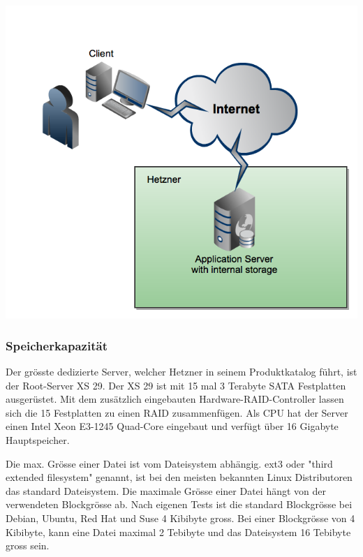\begin{center}
\includegraphics[width=\linewidth, keepaspectratio = true]{media/Hetzner.png}
\end{center}



\subsubsection*{Speicherkapazität}
Der grösste dedizierte Server, welcher Hetzner in seinem Produktkatalog führt, ist der Root-Server XS 29. Der XS 29 ist mit 15 mal 3 Terabyte SATA Festplatten ausgerüstet. Mit dem zusätzlich eingebauten Hardware-RAID-Controller lassen sich die 15 Festplatten zu einen RAID zusammenfügen.
Als CPU hat der Server einen Intel Xeon E3-1245 Quad-Core eingebaut und verfügt über 16 Gigabyte Hauptspeicher. 

Die max. Grösse einer Datei ist vom Dateisystem abhängig. ext3 oder "third extended filesystem" genannt, ist bei den meisten bekannten Linux Distributoren das standard Dateisystem. Die maximale Grösse einer Datei hängt von der verwendeten Blockgrösse ab. Nach eigenen Tests ist die standard Blockgrösse bei Debian, Ubuntu, Red Hat und Suse 4 Kibibyte gross. Bei einer Blockgrösse von 4 Kibibyte, kann eine Datei maximal 2 Tebibyte und das Dateisystem 16 Tebibyte gross sein. \cite{Card1993}

